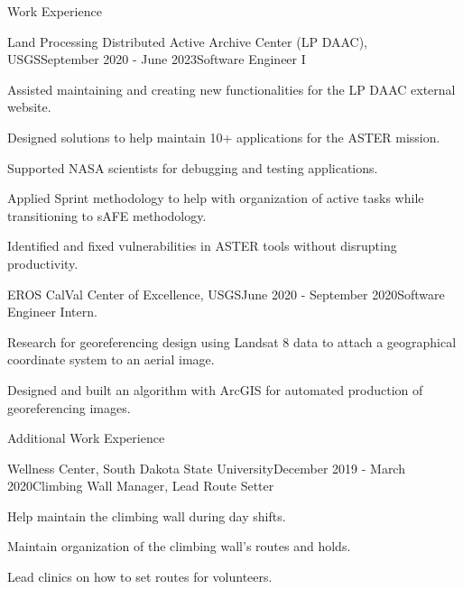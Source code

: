 \documentclass[11pt, a4paper]{resume}
\begin{document}
\begin{rSection}{Work Experience}
\begin{rSubsection}{Land Processing Distributed Active Archive Center (LP DAAC), USGS}{\normalfont September 2020 - June 2023}{Software Engineer I}{}
 \item {\normalfont Assisted maintaining and creating new functionalities for the LP DAAC external website.}
 \item {\normalfont Designed solutions to help maintain 10+ applications for the ASTER mission.}
 \item {\normalfont Supported NASA scientists for debugging and testing applications.}
 \item {\normalfont Applied Sprint methodology to help with organization of active tasks while transitioning to sAFE methodology.}
 \item {\normalfont Identified and fixed vulnerabilities in ASTER tools without disrupting productivity.}
\end{rSubsection}
\begin{rSubsection}{EROS CalVal Center of Excellence, USGS}{\normalfont June 2020 - September 2020}{Software Engineer Intern.}{}
 \item {\normalfont Research for georeferencing design using Landsat 8 data to attach a geographical coordinate system to an aerial image.}
 \item {\normalfont Designed and built an algorithm with ArcGIS for automated production of georeferencing images.}
\end{rSubsection}

\end{rSection}

\begin{rSection}{Additional Work Experience}
\begin{rSubsection}{Wellness Center, South Dakota State University}{\normalfont December 2019 - March 2020}{Climbing Wall Manager, Lead Route Setter}{}
  \item{\normalfont Help maintain the climbing wall during day shifts.}
  \item{\normalfont Maintain organization of the climbing wall's routes and holds.}
  \item{\normalfont Lead clinics on how to set routes for volunteers.}
\end{rSubsection}

\end{rSection}
\end{document}
